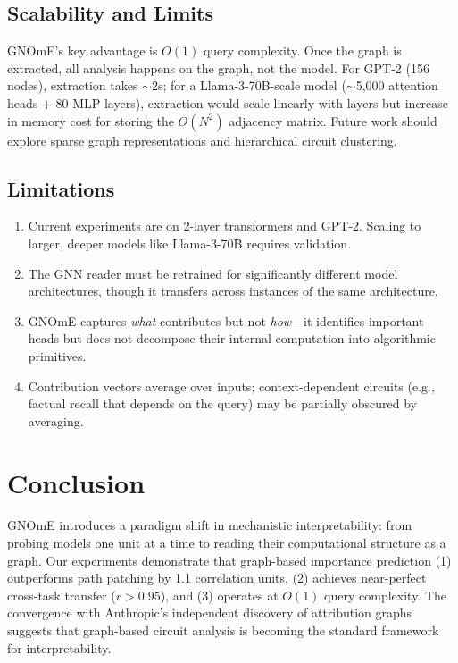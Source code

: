 \documentclass[11pt,a4paper]{article}
\begin{document}
\subsection{Scalability and Limits}

GNOmE's key advantage is $O(1)$ query complexity. Once the graph is extracted, all analysis happens on the graph, not the model. For GPT-2 (156 nodes), extraction takes $\sim$2s; for a Llama-3-70B-scale model ($\sim$5,000 attention heads + 80 MLP layers), extraction would scale linearly with layers but increase in memory cost for storing the $O(N^2)$ adjacency matrix. Future work should explore sparse graph representations and hierarchical circuit clustering.

\subsection{Limitations}

\begin{enumerate}[leftmargin=*]
    \item Current experiments are on 2-layer transformers and GPT-2. Scaling to larger, deeper models like Llama-3-70B requires validation.
    \item The GNN reader must be retrained for significantly different model architectures, though it transfers across instances of the same architecture.
    \item GNOmE captures \emph{what} contributes but not \emph{how}---it identifies important heads but does not decompose their internal computation into algorithmic primitives.
    \item Contribution vectors average over inputs; context-dependent circuits (e.g., factual recall that depends on the query) may be partially obscured by averaging.
\end{enumerate}

\section{Conclusion}

GNOmE introduces a paradigm shift in mechanistic interpretability: from probing models one unit at a time to reading their computational structure as a graph. Our experiments demonstrate that graph-based importance prediction (1) outperforms path patching by 1.1 correlation units, (2) achieves near-perfect cross-task transfer ($r > 0.95$), and (3) operates at $O(1)$ query complexity. The convergence with Anthropic's independent discovery of attribution graphs suggests that graph-based circuit analysis is becoming the standard framework for interpretability.
\end{document}

